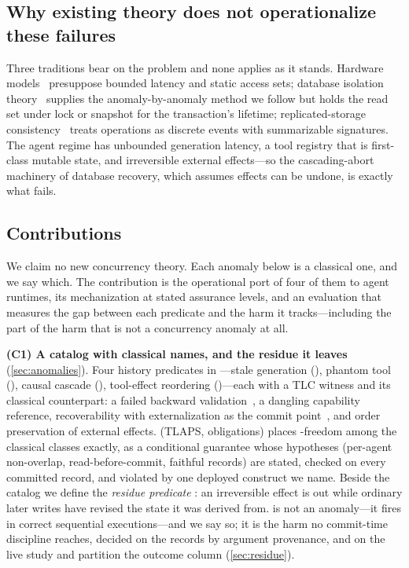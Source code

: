 \subsection{Why existing theory does not operationalize these failures}
\label{sec:why-classical-fails}
Three traditions bear on the problem and none applies as it stands. Hardware
models~\cite{Lamport1979SC,GharachorlooEtAl1990,PulteEtAl2018ARMv8,HerlihyWing1990}
presuppose bounded latency and static access sets; database isolation
theory~\cite{BerensonEtAl1995,Adya1999,AdyaLiskovOneil2000} supplies the
anomaly-by-anomaly method we follow but holds the read set under lock or
snapshot for the transaction's lifetime; replicated-storage
consistency~\cite{ViottiVukolic2016Consistency,LloydEtAl2011COPS,Burckhardt2014,TerryEtAl1994}
treats operations as discrete events with summarizable signatures. The agent
regime has unbounded generation latency, a tool registry that is first-class
mutable state, and irreversible external effects---so the cascading-abort
machinery of database recovery, which assumes effects can be undone, is
exactly what fails.

\subsection{Contributions}
\label{sec:contributions}
We claim no new concurrency theory. Each anomaly below is a classical one,
and we say which. The contribution is the operational port of four of them to
agent runtimes, its mechanization at stated assurance levels, and an
evaluation that measures the gap between each predicate and the harm it
tracks---including the part of the harm that is not a concurrency anomaly at
all.

\smallskip\noindent\textbf{(C1) A catalog with classical names, and the
residue it leaves} (\cref{sec:anomalies}). Four history predicates in
\TLA{}---stale generation (), phantom tool (), causal cascade (),
tool-effect reordering ()---each with a TLC witness and its classical
counterpart: a failed backward validation~\cite{KungRobinson1981OCC}, a
dangling capability reference, recoverability with externalization as the
commit point~\cite{BernsteinHadzilacosGoodman1987}, and order preservation
of external effects.  (TLAPS, \TlapsCommitOrder{}
obligations) places -freedom among the classical classes exactly, as a
conditional guarantee whose hypotheses (per-agent non-overlap,
read-before-commit, faithful records) are stated, checked on every committed
record, and violated by one deployed construct we name. Beside the catalog
we define the \emph{residue predicate} \Rp{}: an irreversible effect is out
while ordinary later writes have revised the state it was derived from. \Rp{}
is not an anomaly---it fires in correct sequential executions---and we say so;
it is the harm no commit-time discipline reaches, decided on the records by
argument provenance, and on the live study  and \Rp{} partition the
outcome column (\cref{sec:residue}).

